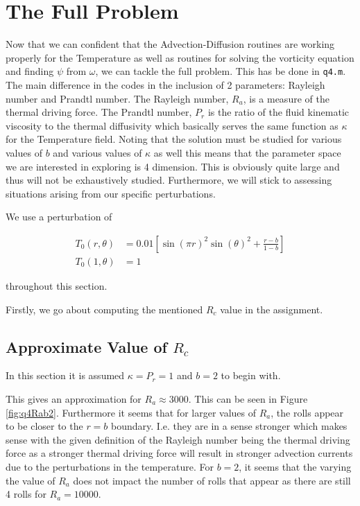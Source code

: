 \documentclass{article}
\begin{document}
\section{The Full Problem}

Now that we can confident that the Advection-Diffusion routines are working properly for the Temperature as well as routines for solving the vorticity equation and finding $\psi$ from $\omega$, we can tackle the full problem. This has be done in \texttt{q4.m}. The main difference in the codes in the inclusion of 2 parameters: Rayleigh number and Prandtl number. The Rayleigh number, $R_a$, is a measure of the thermal driving force. The Prandtl number, $P_r$ is the ratio of the fluid kinematic viscosity to the thermal diffusivity which basically serves the same function as $\kappa$ for the Temperature field. Noting that the solution must be studied for various values of $b$ and various values of $\kappa$ as well this means that the parameter space we are interested in exploring is 4 dimension. This is obviously quite large and thus will not be exhaustively studied. Furthermore, we will stick to assessing situations arising from our specific perturbations.

We use a perturbation of 

\begin{align}
	T_0(r,\theta) &= 0.01 \left[ \sin(\pi r)^2 \sin(\theta)^2 + \frac{r-b}{1-b} \right] \\
	T_0(1,\theta) &= 1
\end{align}

throughout this section.

Firstly, we go about computing the mentioned $R_c$ value in the assignment.

\subsection{Approximate Value of $R_c$}

In this section it is assumed $\kappa = P_r = 1$ and $b=2$ to begin with.

This gives an approximation for $R_a \approx 3000$. This can be seen in Figure \ref{fig:q4Rab2}. Furthermore it seems that for larger values of $R_a$, the rolls appear to be closer to the $r=b$ boundary. I.e. they are in a sense stronger which makes sense with the given definition of the Rayleigh number being the thermal driving force as a stronger thermal driving force will result in stronger advection currents due to the perturbations in the temperature. For $b=2$, it seems that the varying the value of $R_a$ does not impact the number of rolls that appear as there are still 4 rolls for $R_a = 10000$. 
\end{document}
